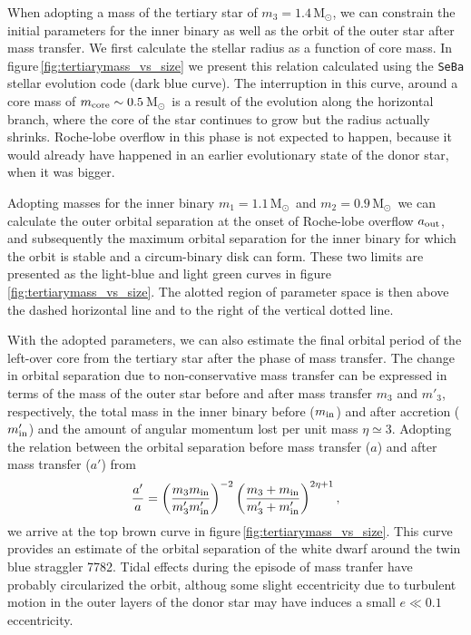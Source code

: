 \documentclass{aastex62}
\newcommand{\MSun}{\mbox{M$_\odot$}}
\begin{document}
When adopting a mass of the tertiary star of $m_3 = 1.4$\,\MSun, we
can constrain the initial parameters for the inner binary as well as
the orbit of the outer star after mass transfer. We first calculate
the stellar radius as a function of core mass. In
figure\,\ref{fig:tertiarymass_vs_size} we present this relation
calculated using the {\tt SeBa} stellar evolution code
\cite{1996A&A...309..179P} (dark blue curve).  The interruption in
this curve, around a core mass of $m_{\rm core} \sim 0.5$\,\MSun\, is
a result of the evolution along the horizontal branch, where the core
of the star continues to grow but the radius actually shrinks.
Roche-lobe overflow in this phase is not expected to happen, because
it would already have happened in an earlier evolutionary state of the
donor star, when it was bigger.

Adopting masses for the inner binary $m_1=1.1$\,\MSun\, and
$m_2=0.9$\,\MSun\, we can calculate the outer orbital separation at
the onset of Roche-lobe overflow $a_{\rm out}$, and subsequently the
maximum orbital separation for the inner binary for which the orbit is
stable and a circum-binary disk can form. These two limits are
presented as the light-blue and light green curves in
figure\,\ref{fig:tertiarymass_vs_size}.  The alotted region of
parameter space is then above the dashed horizontal line and to the
right of the vertical dotted line.

With the adopted parameters, we can also estimate the final orbital
period of the left-over core from the tertiary star after the phase of
mass transfer.  The change in orbital separation due to
non-conservative mass transfer can be expressed in terms of the mass
of the outer star before and after mass transfer $m_3$ and $m'_3$,
respectively, the total mass in the inner binary before ($m_{\rm in}$)
and after accretion ($m'_{\rm in}$) and the amount of angular momentum
lost per unit mass $\eta \simeq 3$. Adopting the relation between the
orbital separation before mass transfer ($a$) and after mass transfer
($a'$) from \cite{1995A&A...296..691P}
\begin{equation}
  {a' \over a} = \left( {m_3 m_{\rm in} \over m'_3 m'_{\rm in}} \right)^{-2}
  \left( {m_3 + m_{\rm in} \over m'_3 + m'_{\rm in}} \right)^{2\eta + 1},
\end{equation}
we arrive at the top brown curve in
figure\,\ref{fig:tertiarymass_vs_size}. This curve provides an
estimate of the orbital separation of the white dwarf around the twin
blue straggler 7782. Tidal effects during the episode of mass tranfer
have probably circularized the orbit, althoug some slight eccentricity
due to turbulent motion in the outer layers of the donor star may have
induces a small $e \ll 0.1$ eccentricity.
\end{document}
